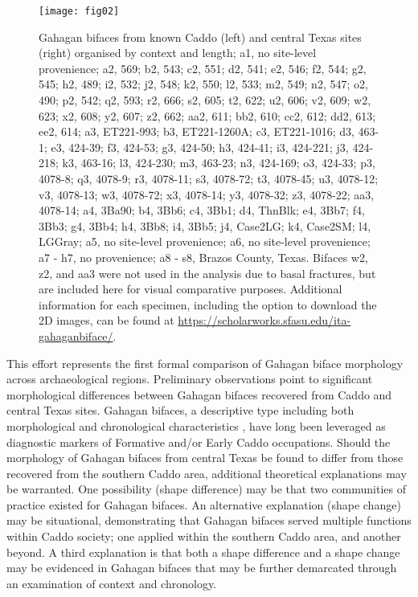 \documentclass[review]{elsarticle}
\begin{document}
\begin{figure}[htbp]\centering
\texttt{[image: fig02]}
\caption{Gahagan bifaces from known Caddo (left) and central Texas sites (right) organised by context and length; a1, no site-level provenience; a2, 569; b2, 543; c2, 551; d2, 541; e2, 546; f2, 544; g2, 545; h2, 489; i2, 532; j2, 548; k2, 550; l2, 533; m2, 549; n2, 547; o2, 490; p2, 542; q2, 593; r2, 666; s2, 605; t2, 622; u2, 606; v2, 609; w2, 623; x2, 608; y2, 607; z2, 662; aa2, 611; bb2, 610; cc2, 612; dd2, 613; ee2, 614; a3, ET221-993; b3, ET221-1260A; c3, ET221-1016; d3, 463-1; e3, 424-39; f3, 424-53; g3, 424-50; h3, 424-41; i3, 424-221; j3, 424-218; k3, 463-16; l3, 424-230; m3, 463-23; n3, 424-169; o3, 424-33; p3, 4078-8; q3, 4078-9; r3, 4078-11; s3, 4078-72; t3, 4078-45; u3, 4078-12; v3, 4078-13; w3, 4078-72; x3, 4078-14; y3, 4078-32; z3, 4078-22; aa3, 4078-14; a4, 3Ba90; b4, 3Bb6; c4, 3Bb1; d4, ThnBlk; e4, 3Bb7; f4, 3Bb3; g4, 3Bb4; h4, 3Bb8; i4, 3Bb5; j4, Case2LG; k4, Case2SM; l4, LGGray; a5, no site-level provenience; a6, no site-level provenience; a7 - h7, no provenience; a8 - s8, Brazos County, Texas. Bifaces w2, z2, and aa3 were not used in the analysis due to basal fractures, but are included here for visual comparative purposes. Additional information for each specimen, including the option to download the 2D images, can be found at \href{https://scholarworks.sfasu.edu/ita-gahaganbiface/}{https://scholarworks.sfasu.edu/ita-gahaganbiface/}.}
\label{fig:fig2}
\end{figure}

This effort represents the first formal comparison of Gahagan biface morphology across archaeological regions. Preliminary observations point to significant morphological differences between Gahagan bifaces recovered from Caddo and central Texas sites. Gahagan bifaces, a descriptive type including both morphological and chronological characteristics \citep{RN20847,RN4924,RN3684}, have long been leveraged as diagnostic markers of Formative and/or Early Caddo occupations. Should the morphology of Gahagan bifaces from central Texas be found to differ from those recovered from the southern Caddo area, additional theoretical explanations may be warranted. One possibility (shape difference) may be that two communities of practice existed for Gahagan bifaces. An alternative explanation (shape change) may be situational, demonstrating that Gahagan bifaces served multiple functions within Caddo society; one applied within the southern Caddo area, and another beyond. A third explanation is that both a shape difference and a shape change may be evidenced in Gahagan bifaces that may be further demarcated through an examination of context and chronology.
\end{document}
